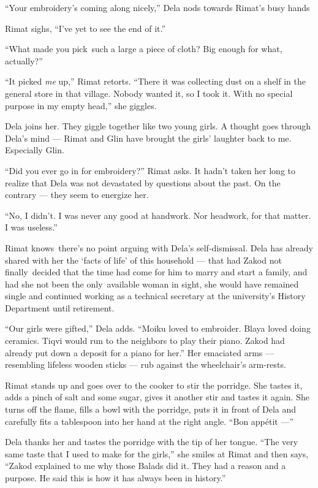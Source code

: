 \documentclass[twoside,11pt,openany]{book}
\begin{document}
``Your embroidery's coming along nicely,'' Dela nods towards Rimat's busy hands

Rimat sighs, ``I've yet to see the end of it.''

``What made you pick~such a large a piece of cloth?  Big enough for what, actually?''

``It picked \textit{me} up,'' Rimat retorts. ``There it was collecting dust on a
shelf in the general store in that village. Nobody wanted it, so I took it. With no special purpose in my empty
head,'' she giggles.

Dela joins her. They giggle together like two young girls. A thought goes through Dela's mind ---  Rimat and Glin have
brought the girls{'} laughter back to me. Especially Glin.

``Did you ever go in for embroidery?'' Rimat asks. It hadn't taken her long to realize that
Dela was not devastated by questions about the past. On the contrary --- they seem to energize her.

``No, I didn't. I was never any good at handwork. Nor headwork, for that matter. I was
useless.''

Rimat knows~there's no point arguing with Dela's self-dismissal. Dela has already shared with her the `facts of life' of
this household ---  that had Zakod not finally~decided that the time had come for him to marry and start a family, and
had she not been the only~available woman in sight, she would have remained single and continued working as a technical
secretary at the university's History Department until retirement.

``Our girls were gifted,'' Dela adds. ``Moiku loved to embroider. Blaya loved
doing ceramics. Tiqvi would run to the neighbors to play their piano. Zakod had already put down a deposit for a piano
for her.''  Her emaciated arms --- resembling lifeless wooden sticks --- rub against the wheelchair's
arm-rests.

Rimat stands up and goes over to the cooker to stir the porridge. She tastes it, adds a pinch of salt and some sugar,
gives it another stir and tastes it again. She turns off the flame, fills a bowl with the porridge, puts it in front of
Dela and carefully fits a tablespoon into her hand at the right angle. ``Bon app\'etit ---''


Dela thanks her and tastes the porridge with the tip of her tongue. ``The very same taste that I used to
make for the girls,'' she smiles at Rimat and then says, ``Zakod explained to me why those
Balads did it. They had a reason and a purpose. He said this is how it has always been in history.''
\end{document}
